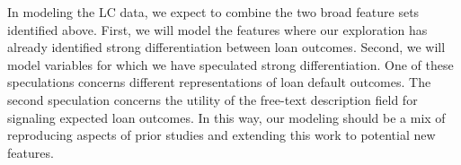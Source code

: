 In modeling the LC data, we expect to combine the two broad feature
sets identified above. First, we will model the features where our
exploration has already identified strong differentiation between loan
outcomes. Second, we will model variables for which we have speculated
strong differentiation. One of these speculations concerns different
representations of loan default outcomes. The second speculation
concerns the utility of the free-text description field for signaling
expected loan outcomes. In this way, our modeling should be a mix of
reproducing aspects of prior studies and extending this work to
potential new features.

\vfill\eject
\singlecolumn
{}


\bye
